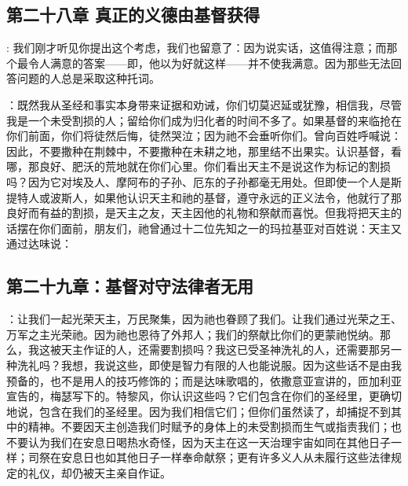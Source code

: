
\subsection{第二十八章 真正的义德由基督获得}

: 我们刚才听见你提出这个考虑，我们也留意了：因为说实话，这值得注意；而那个最令人满意的答案——即，他以为好就这样——并不使我满意。因为那些无法回答问题的人总是采取这种托词。\par

：既然我从圣经和事实本身带来证据和劝诫，你们切莫迟延或犹豫，相信我，尽管我是一个未受割损的人；留给你们成为归化者的时间不多了。如果基督的来临抢在你们前面，你们将徒然后悔，徒然哭泣；因为祂不会垂听你们。曾向百姓呼喊说：因此，不要撒种在荆棘中，不要撒种在未耕之地，那里结不出果实。认识基督，看哪，那良好、肥沃的荒地就在你们心里。你们看出天主不是说这作为标记的割损吗？因为它对埃及人、摩阿布的子孙、厄东的子孙都毫无用处。但即使一个人是斯提特人或波斯人，如果他认识天主和祂的基督，遵守永远的正义法令，他就行了那良好而有益的割损，是天主之友，天主因他的礼物和祭献而喜悦。但我将把天主的话摆在你们面前，朋友们，祂曾通过十二位先知之一的玛拉基亚对百姓说：天主又通过达味说：\par


\subsection{第二十九章：基督对守法律者无用}

：让我们一起光荣天主，万民聚集，因为祂也眷顾了我们。让我们通过光荣之王、万军之主光荣祂。因为祂也恩待了外邦人；我们的祭献比你们的更蒙祂悦纳。那么，我这被天主作证的人，还需要割损吗？我这已受圣神洗礼的人，还需要那另一种洗礼吗？我想，我说这些，即使是智力有限的人也能说服。因为这些话不是由我预备的，也不是用人的技巧修饰的；而是达味歌唱的，依撒意亚宣讲的，匝加利亚宣告的，梅瑟写下的。特黎风，你认识这些吗？它们包含在你们的圣经里，更确切地说，包含在我们的圣经里。因为我们相信它们；但你们虽然读了，却捕捉不到其中的精神。不要因天主创造我们时赋予的身体上的未受割损而生气或指责我们；也不要认为我们在安息日喝热水奇怪，因为天主在这一天治理宇宙如同在其他日子一样；司祭在安息日也如其他日子一样奉命献祭；更有许多义人从未履行这些法律规定的礼仪，却仍被天主亲自作证。\par

